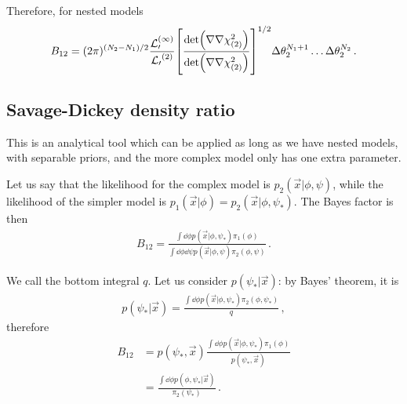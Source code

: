 \documentclass[main.tex]{subfiles}
\begin{document}
Therefore, for nested models 
%
\begin{align}
B_{12} = (2 \pi )^{(N_2 - N_1) / 2 } \frac{\mathcal{L_0^{(1)}}}{\mathcal{L_0}^{(2)}} \qty[\frac{\det (\nabla \nabla \chi^2_{(2)})}{\det (\nabla \nabla \chi^2_{(2)})}]^{1/2}
\Delta \theta _2^{N_1 +1 } \dots \Delta \theta _2^{N_2 }
\,.
\end{align}

\subsection{Savage-Dickey density ratio}

This is an analytical tool which can be applied as long as we have nested models, with separable priors, and the more complex model only has one extra parameter. 

Let us say that the likelihood for the complex model is \(p_2 (\vec{x} | \phi , \psi )\), while the likelihood of the simpler model is \(p_1 (\vec{x} | \phi ) = p_2 (\vec{x} | \phi , \psi_{*})\).
The Bayes factor is then 
%
\begin{align}
B_{12}  =\frac{\int \dd{\phi } p(\vec{x} | \phi , \psi_*) \pi_1 (\phi )}{\int \dd{\phi } \dd{\psi } p(\vec{x} | \phi , \psi ) \pi_2 (\phi , \psi )}
\,.
\end{align}

We call the bottom integral \(q\). 
Let us consider \(p(\psi_* | \vec{x})\): by Bayes' theorem, it is 
%
\begin{align}
p(\psi _* | \vec{x}) = \frac{\int \dd{\phi } p(\vec{x} | \phi , \psi_* ) \pi _2 (\phi, \psi_*)}{q} 
\,,
\end{align}
%
therefore 
%
\begin{align}
B_{12} &= p(\psi _*, \vec{x}) \frac{\int \dd{\phi } p(\vec{x} | \phi , \psi_*) \pi_1 (\phi )}{p(\psi _*, \vec{x}) }  \\
&= \frac{\int \dd{\phi } p(\phi, \psi _* | \vec{x})}{\pi_2 (\psi _*)}
\,.
\end{align}

\end{document}
